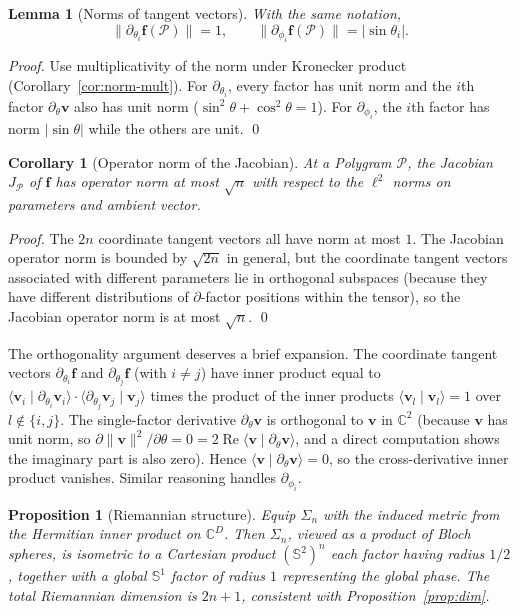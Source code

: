 \documentclass[11pt,letterpaper]{article}
\newtheorem{lemma}[theorem]{Lemma}
\newtheorem{proposition}[theorem]{Proposition}
\newtheorem{corollary}[theorem]{Corollary}
\theoremstyle{definition}
\newcommand{\C}{\mathbb{C}}
\newcommand{\Sphere}{\mathbb{S}}
\newcommand{\Polygram}{\mathcal{P}}
\newcommand{\re}{\operatorname{Re}}
\newcommand{\inner}[2]{\langle #1 \mid #2 \rangle}
\newcommand{\norm}[1]{\lVert #1 \rVert}
\newcommand{\abs}[1]{\lvert #1 \rvert}
\begin{document}
\begin{lemma}[Norms of tangent vectors]
\label{lem:tangent-norms}
With the same notation,
\[
\norm{\partial_{\theta_{i}} \bm{f}(\Polygram)} = 1, \qquad
\norm{\partial_{\phi_{i}} \bm{f}(\Polygram)} = \abs{\sin\theta_{i}}.
\]
\end{lemma}
\begin{proof}
Use multiplicativity of the norm under Kronecker product
(Corollary~\ref{cor:norm-mult}). For $\partial_{\theta_{i}}$, every factor has
unit norm and the $i$th factor $\partial_{\theta}\bm{v}$ also has unit norm
($\sin^{2}\theta + \cos^{2}\theta = 1$). For $\partial_{\phi_{i}}$, the $i$th
factor has norm $\abs{\sin\theta}$ while the others are unit. \qed
\end{proof}

\begin{corollary}[Operator norm of the Jacobian]
\label{cor:jac-norm}
At a Polygram $\Polygram$, the Jacobian $J_{\Polygram}$ of $\bm{f}$ has
operator norm at most $\sqrt{n}$ with respect to the $\ell^{2}$ norms on
parameters and ambient vector.
\end{corollary}
\begin{proof}
The $2n$ coordinate tangent vectors all have norm at most $1$. The Jacobian
operator norm is bounded by $\sqrt{2n}$ in general, but the coordinate tangent
vectors associated with different parameters lie in orthogonal subspaces
(because they have different distributions of $\partial$-factor positions
within the tensor), so the Jacobian operator norm is at most $\sqrt{n}$.
\qed
\end{proof}

The orthogonality argument deserves a brief expansion. The coordinate tangent
vectors $\partial_{\theta_{i}} \bm{f}$ and $\partial_{\theta_{j}} \bm{f}$ (with
$i \neq j$) have inner product equal to
$\inner{\bm{v}_{i}}{\partial_{\theta_{i}}\bm{v}_{i}} \cdot
 \inner{\partial_{\theta_{j}}\bm{v}_{j}}{\bm{v}_{j}}$ times the product of the
inner products $\inner{\bm{v}_{l}}{\bm{v}_{l}} = 1$ over $l \notin \{i,j\}$.
The single-factor derivative $\partial_{\theta}\bm{v}$ is orthogonal to
$\bm{v}$ in $\C^{2}$ (because $\bm{v}$ has unit norm, so $\partial \norm{\bm{v}}^{2}
/ \partial \theta = 0 = 2\re \inner{\bm{v}}{\partial_{\theta}\bm{v}}$, and a
direct computation shows the imaginary part is also zero). Hence
$\inner{\bm{v}}{\partial_{\theta}\bm{v}} = 0$, so the cross-derivative inner
product vanishes. Similar reasoning handles $\partial_{\phi_{i}}$.

\begin{proposition}[Riemannian structure]
\label{prop:riemannian}
Equip $\Sigma_{n}$ with the induced metric from the Hermitian inner product on
$\C^{D}$. Then $\Sigma_{n}$, viewed as a product of Bloch spheres, is
isometric to a Cartesian product $(\Sphere^{2})^{n}$ each factor having
radius $1/2$, together with a global $\Sphere^{1}$ factor of radius $1$
representing the global phase. The total Riemannian dimension is $2n + 1$,
consistent with Proposition~\ref{prop:dim}.
\end{proposition}
\end{document}
